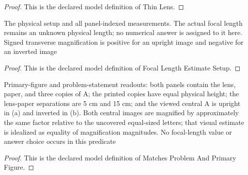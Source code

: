 \begin{proof}
  This is the declared model definition of Thin Lens.
\end{proof}
\begin{definition}
  \label{def:physics:phyx-mini-0149:phyxminiproblems-problemphyxmini0149-focallengthestimatesetup}
  The physical setup and all panel-indexed measurements. The actual focal length remains an unknown physical length; no numerical answer is assigned to it here. Signed transverse magnification is positive for an upright image and negative for an inverted image
\end{definition}
\begin{proof}
  This is the declared model definition of Focal Length Estimate Setup.
\end{proof}
\begin{definition}
  \label{def:physics:phyx-mini-0149:phyxminiproblems-problemphyxmini0149-matchesproblemandprimaryfigure}
  Primary-figure and problem-statement readouts: both panels contain the lens, paper, and three copies of A; the printed copies have equal physical height; the lens-paper separations are 5 cm and 15 cm; and the viewed central A is upright in (a) and inverted in (b). Both central images are magnified by approximately the same factor relative to the uncovered equal-sized letters; that visual estimate is idealized as equality of magnification magnitudes. No focal-length value or answer choice occurs in this predicate
\end{definition}
\begin{proof}
  This is the declared model definition of Matches Problem And Primary Figure.
\end{proof}
